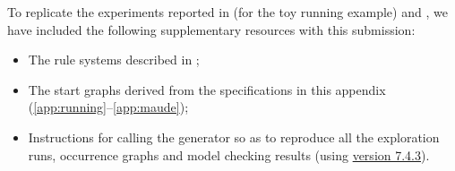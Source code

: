 To replicate the \GROOVE experiments reported in  (for the toy running example) and , we have included the following supplementary resources with this submission:
\begin{itemize}
\item The rule systems described in ;
\item The start graphs derived from the \BioResolve specifications in this appendix (\ref{app:running}--\ref{app:maude});
\item Instructions for calling the \GROOVE generator so as to reproduce all the exploration runs, occurrence graphs and model checking results (using \href{https://github.com/nl-utwente-groove/code/releases/tag/release-7_4_3}{\GROOVE version 7.4.3}).
\end{itemize}

